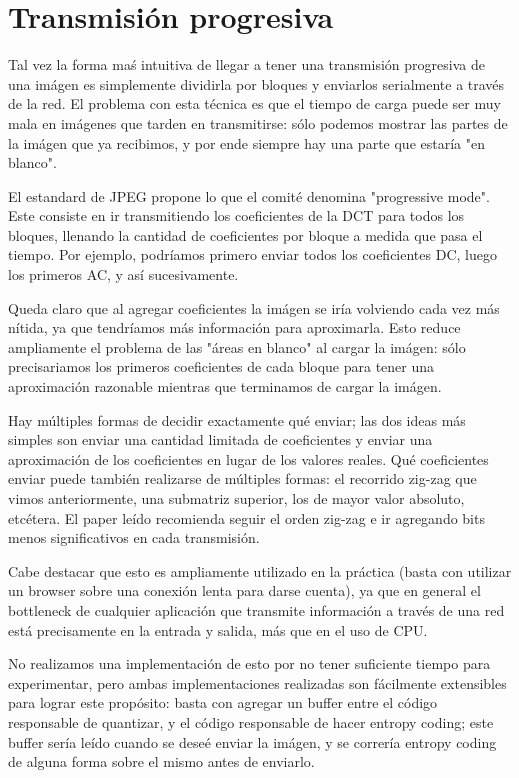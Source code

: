 \documentclass{article}
\begin{document}
\section{Transmisión progresiva}

Tal vez la forma maś intuitiva de llegar a tener una transmisión progresiva de una imágen es simplemente dividirla por bloques y enviarlos serialmente a través de la red. El problema con esta técnica es que el tiempo de carga puede ser muy mala en imágenes que tarden en transmitirse: sólo podemos mostrar las partes de la imágen que ya recibimos, y por ende siempre hay una parte que estaría "en blanco".

El estandard de JPEG propone lo que el comité denomina "progressive mode". Este consiste en ir transmitiendo los coeficientes de la DCT para todos los bloques, llenando la cantidad de coeficientes por bloque a medida que pasa el tiempo. Por ejemplo, podríamos primero enviar todos los coeficientes DC, luego los primeros AC, y así sucesivamente.

Queda claro que al agregar coeficientes la imágen se iría volviendo cada vez más nítida, ya que tendríamos más información para aproximarla. Esto reduce ampliamente el problema de las "áreas en blanco" al cargar la imágen: sólo precisariamos los primeros coeficientes de cada bloque para tener una aproximación razonable mientras que terminamos de cargar la imágen.

Hay múltiples formas de decidir exactamente qué enviar; las dos ideas más simples son enviar una cantidad limitada de coeficientes y enviar una aproximación de los coeficientes en lugar de los valores reales. Qué coeficientes enviar puede también realizarse de múltiples formas: el recorrido zig-zag que vimos anteriormente, una submatriz superior, los de mayor valor absoluto, etcétera. El paper leído recomienda seguir el orden zig-zag e ir agregando bits menos significativos en cada transmisión.

Cabe destacar que esto es ampliamente utilizado en la práctica (basta con utilizar un browser sobre una conexión lenta para darse cuenta), ya que en general el bottleneck de cualquier aplicación que transmite información a través de una red está precisamente en la entrada y salida, más que en el uso de CPU.

No realizamos una implementación de esto por no tener suficiente tiempo para experimentar, pero ambas implementaciones realizadas son fácilmente extensibles para lograr este propósito: basta con agregar un buffer entre el código responsable de quantizar, y el código responsable de hacer entropy coding; este buffer sería leído cuando se deseé enviar la imágen, y se correría entropy coding de alguna forma sobre el mismo antes de enviarlo.
\end{document}
